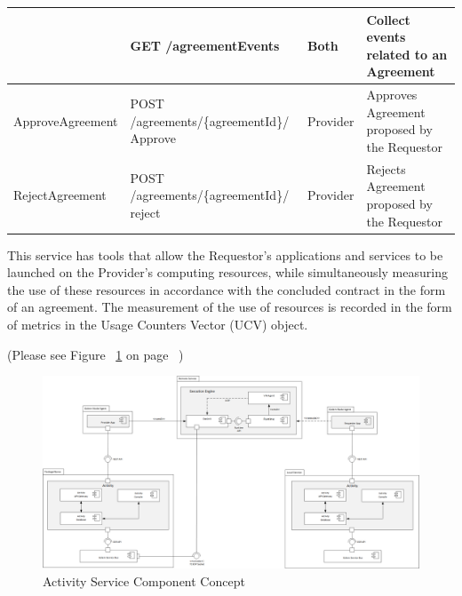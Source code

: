 \begin{enumerate}
\begin{enumerate}
\begin{table}[H]
\begin{center}
\begin{tabular}{|p{3cm}|p{7cm}|p{1.5cm}|p{4cm}|}
					& GET /agreementEvents											& Both 		& 	Collect events related to an Agreement \\
\hline

ApproveAgreement	& POST /agreements/\{agreementId\}/ \newline Approve			& Provider	&	Approves Agreement proposed by the Requestor \\
\hline

RejectAgreement		& POST /agreements/\{agreementId\}/ \newline reject				& Provider	&	Rejects Agreement proposed by the Requestor	\\
\hline

\end{tabular}
\end{center}
\end{table}

\end{enumerate}

\end{enumerate}



This service has tools that allow the Requestor's applications and services to be launched on the Provider's computing resources,
while simultaneously measuring the use of these resources in accordance with the concluded contract in the form of an agreement. 
The measurement of the use of resources is recorded in the form of metrics in the Usage Counters Vector (UCV) object.


(Please see Figure ~\ref{fig:ASCC} on page ~\pageref{fig:ASCC})

\begin{figure}[H]
    \centering
    \includegraphics[width=14cm,angle=0]{./diag/Reference/ActivityService-Reference.png}
	\caption{Activity Service Component Concept}
    \label{fig:ASCC}
\end{figure}


